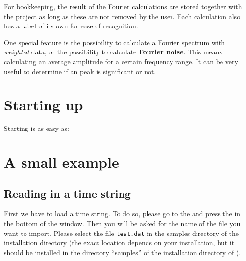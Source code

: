 
For bookkeeping, the result of the Fourier calculations are stored
together with the project as long as these are not removed by the user.
Each calculation also has a label of its own for ease of recognition.

One special feature is the possibility to calculate
a Fourier spectrum with {\it weighted} data, 
or the possibility to calculate 
{\bf Fourier noise}. This means calculating an average amplitude for 
a certain frequency range. It can be very useful to determine if 
an peak is significant or not.

\section{Starting up \periodname}
\label{basic.start}

Starting \period is as easy as: 

\section{A small example}
\label{basic.example}

\subsection{Reading in a time string}
First we have to load a time string.
To do so, please go to the 
 and press
the  in the bottom of the window.
Then you will be asked for the name of the file you want to import.
Please select the file {\tt test.dat} in the samples directory of
the \period installation directory 
(the exact location depends on your installation, but it should be
installed in the directory ``samples'' of the installation directory 
of \period).

